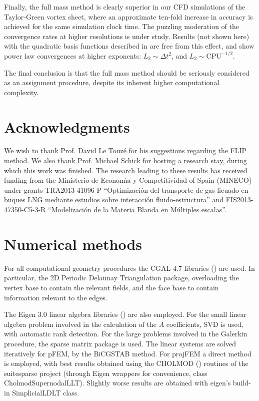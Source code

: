 \documentclass{ws-ijcm}
\begin{document}
Finally, the full mass method is clearly superior in our CFD
simulations of the Taylor-Green vortex sheet, where an approximate
ten-fold increase in accuracy is achieved for the same simulation
clock time.  The puzzling moderation of the convergence rates at
higher resolutions is under study. Results (not shown here) with the
quadratic basis functions described in \cite{duque_2017a} are free
from this effect, and show power law convergences at higher exponents:
$L_2 \sim \Delta t^2$, and $L_2 \sim \mathrm{CPU}^{-1/2}$.


The final conclusion is that the full mass method should be seriously
considered as an assignment procedure, despite its inherent higher
computational complexity.


\section*{Acknowledgments}

We wish to thank Prof. David Le Touz\'e for his suggestions regarding
the FLIP method. We also thank Prof. Michael Schick for hosting a
research stay, during which this work was finished. The research
leading to these results has received funding from the Ministerio de
Econom\'{\i}a y Competitividad of Spain (MINECO) under grants
TRA2013-41096-P ``Optimizaci\'on del transporte de gas licuado en
buques LNG mediante estudios sobre interacci\'on fluido-estructura''
and FIS2013-47350-C5-3-R ``Modelizaci\'on de la Materia Blanda en
M\'ultiples escalas''.



%




\appendix



\section{Numerical methods}
\label{sec:numerical}

For all computational geometry procedures the CGAL 4.7 libraries
(\cite{CGAL}) are used.  In particular, the 2D Periodic Delaunay
Triangulation package, overloading the vertex base to contain the
relevant fields, and the face base to contain information relevant to
the edges.

The Eigen 3.0 linear algebra libraries (\cite{Eigen}) are also
employed.  For the small linear algebra problem involved in the
calculation of the $A$ coefficients, SVD is used, with automatic rank
detection. For the large problems involved in the Galerkin procedure,
the sparse matrix package is used. The linear systems are solved
iteratively for pFEM, by the BiCGSTAB method.  For projFEM a direct
method is employed, with best results obtained using the CHOLMOD
(\cite{cholmod}) routines of the suitesparse project (through Eigen
wrappers for convenience, class CholmodSupernodalLLT). Slightly worse
results are obtained with eigen's build-in SimplicialLDLT class.
\end{document}
